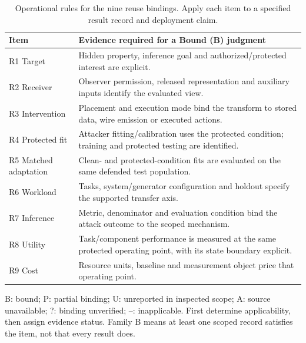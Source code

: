 \begin{table}[t]\centering\footnotesize
\caption{Operational rules for the nine reuse bindings. Apply each item to a specified result record and deployment claim.}\label{tab:audit-rules}
\begin{tabularx}{\columnwidth}{@{}lY@{}}\toprule
Item & Evidence required for a Bound (B) judgment\\\midrule
R1 Target & Hidden property, inference goal and authorized/protected interest are explicit.\\
R2 Receiver & Observer permission, released representation and auxiliary inputs identify the evaluated view.\\
R3 Intervention & Placement and execution mode bind the transform to stored data, wire emission or executed actions.\\
R4 Protected fit & Attacker fitting/calibration uses the protected condition; training and protected testing are identified.\\
R5 Matched adaptation & Clean- and protected-condition fits are evaluated on the same defended test population.\\
R6 Workload & Tasks, system/generator configuration and holdout specify the supported transfer axis.\\
R7 Inference & Metric, denominator and evaluation condition bind the attack outcome to the scoped mechanism.\\
R8 Utility & Task/component performance is measured at the same protected operating point, with its state boundary explicit.\\
R9 Cost & Resource units, baseline and measurement object price that operating point.\\\bottomrule
\end{tabularx}
\par\smallskip\raggedright B: bound; P: partial binding; U: unreported in inspected scope; A: source unavailable; ?: binding unverified; --: inapplicable. First determine applicability, then assign evidence status. Family B means at least one scoped record satisfies the item, not that every result does.
\end{table}
